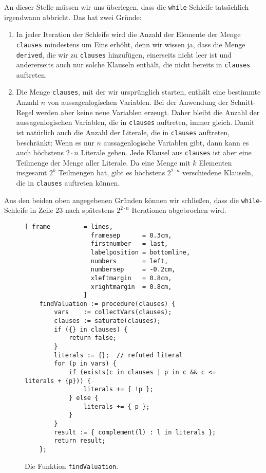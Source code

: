 An dieser Stelle m\"{u}ssen wir uns \"{u}berlegen, dass die \texttt{while}-Schleife tats\"{a}chlich irgendwann
abbricht.  Das hat zwei Gr\"{u}nde:  
\begin{enumerate}
\item In jeder Iteration der Schleife wird die Anzahl der Elemente der Menge \texttt{clauses}
      mindestens um Eins erh\"{o}ht, denn wir wissen ja, dass die Menge \texttt{derived}, die wir zu
      \texttt{clauses} hinzuf\"{u}gen, einerseits nicht leer ist und andererseits auch nur solche
      Klauseln enth\"{a}lt, die nicht bereits in \texttt{clauses} auftreten.
\item Die Menge \texttt{clauses}, mit der wir urspr\"{u}nglich starten, enth\"{a}lt eine bestimmte Anzahl $n$
      von aussagenlogischen Variablen.  Bei der Anwendung der Schnitt-Regel werden aber keine neue
      Variablen erzeugt.  Daher bleibt die Anzahl der aussagenlogischen Variablen, die in
      \texttt{clauses} auftreten, immer gleich.  Damit ist nat\"{u}rlich auch die Anzahl der Literale,
      die in \texttt{clauses} auftreten, beschr\"{a}nkt: Wenn es nur $n$ aussagenlogische Variablen gibt,
      dann kann es auch h\"{o}chstens $2 \cdot n$ Literale geben.  Jede Klausel aus \texttt{clauses} ist
      aber eine Teilmenge der Menge aller Literale.  Da eine Menge mit $k$ Elementen insgesamt $2^k$
      Teilmengen hat, gibt es h\"{o}chstens $2^{2 \cdot n}$ verschiedene Klauseln, die in
      \texttt{clauses} auftreten k\"{o}nnen.  
\end{enumerate}
Aus den beiden oben angegebenen Gr\"{u}nden k\"{o}nnen wir schlie\ss{}en, dass die \texttt{while}-Schleife in
Zeile 23 nach sp\"{a}testens $2^{2 \cdot n}$ Iterationen abgebrochen wird. 

\begin{figure}[!ht]
\centering
\begin{Verbatim}[ frame         = lines, 
                  framesep      = 0.3cm, 
                  firstnumber   = last,
                  labelposition = bottomline,
                  numbers       = left,
                  numbersep     = -0.2cm,
                  xleftmargin   = 0.8cm,
                  xrightmargin  = 0.8cm,
                ]
    findValuation := procedure(clauses) {
        vars    := collectVars(clauses);
        clauses := saturate(clauses);
        if ({} in clauses) {
            return false;
        }
        literals := {};  // refuted literal
        for (p in vars) {
            if (exists(c in clauses | p in c && c <= literals + {p})) {
                literals += { !p };
            } else {
                literals += { p };
            }
        }
        result := { complement(l) : l in literals };
        return result;
    };
\end{Verbatim}
\vspace*{-0.3cm}
\caption{Die Funktion \texttt{findValuation}.}
\label{fig:completeness.stlx-3}
\end{figure}

